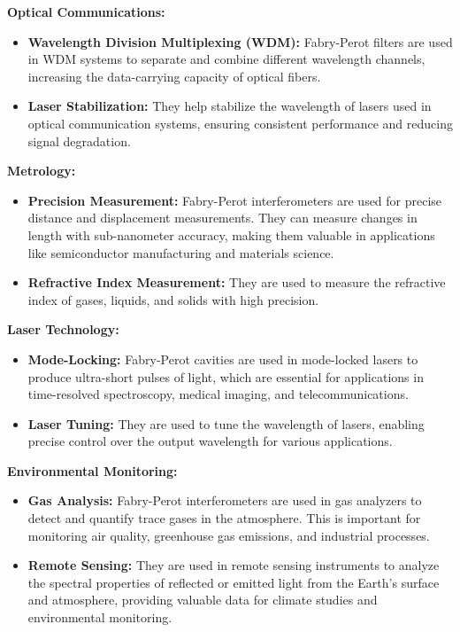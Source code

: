 \documentclass[
  a4paper,
]{book}
\providecommand{\tightlist}{%
  \setlength{\itemsep}{0pt}\setlength{\parskip}{0pt}}
\begin{document}
\begin{tcolorbox}
\textbf{Optical Communications:}

\begin{itemize}
\tightlist
\item
  \textbf{Wavelength Division Multiplexing (WDM):} Fabry-Perot filters
  are used in WDM systems to separate and combine different wavelength
  channels, increasing the data-carrying capacity of optical fibers.
\item
  \textbf{Laser Stabilization:} They help stabilize the wavelength of
  lasers used in optical communication systems, ensuring consistent
  performance and reducing signal degradation.
\end{itemize}

\textbf{Metrology:}

\begin{itemize}
\tightlist
\item
  \textbf{Precision Measurement:} Fabry-Perot interferometers are used
  for precise distance and displacement measurements. They can measure
  changes in length with sub-nanometer accuracy, making them valuable in
  applications like semiconductor manufacturing and materials science.
\item
  \textbf{Refractive Index Measurement:} They are used to measure the
  refractive index of gases, liquids, and solids with high precision.
\end{itemize}

\textbf{Laser Technology:}

\begin{itemize}
\tightlist
\item
  \textbf{Mode-Locking:} Fabry-Perot cavities are used in mode-locked
  lasers to produce ultra-short pulses of light, which are essential for
  applications in time-resolved spectroscopy, medical imaging, and
  telecommunications.
\item
  \textbf{Laser Tuning:} They are used to tune the wavelength of lasers,
  enabling precise control over the output wavelength for various
  applications.
\end{itemize}

\textbf{Environmental Monitoring:}

\begin{itemize}
\tightlist
\item
  \textbf{Gas Analysis:} Fabry-Perot interferometers are used in gas
  analyzers to detect and quantify trace gases in the atmosphere. This
  is important for monitoring air quality, greenhouse gas emissions, and
  industrial processes.
\item
  \textbf{Remote Sensing:} They are used in remote sensing instruments
  to analyze the spectral properties of reflected or emitted light from
  the Earth's surface and atmosphere, providing valuable data for
  climate studies and environmental monitoring.
\end{itemize}


\end{tcolorbox}
\end{document}
